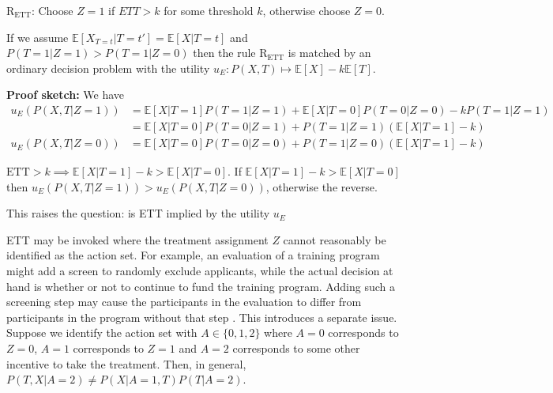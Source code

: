 \textbf{$\text{R}_{\text{ETT}}$}: Choose $Z=1$ if $ETT>k$ for some threshold $k$, otherwise choose $Z=0$.

If we assume $\mathbb{E}[X_{T=t}|T=t']=\mathbb{E}[X|T=t]$ and $P(T=1|Z=1)>P(T=1|Z=0)$ then the rule \textbf{$\text{R}_{\text{ETT}}$} is matched by an ordinary decision problem with the utility $u_E:P(X,T)\mapsto \mathbb{E}[X]-k\mathbb{E}[T]$.

\textbf{Proof sketch:} We have
\begin{align}
    u_E(P(X,T|Z=1)) &= \mathbb{E}[X|T=1]P(T=1|Z=1) + \mathbb{E}[X|T=0]P(T=0|Z=0) - kP(T=1|Z=1)\\
    &= \mathbb{E}[X|T=0]P(T=0|Z=1) + P(T=1|Z=1)(\mathbb{E}[X|T=1] - k)\\
    u_E(P(X,T|Z=0)) &= \mathbb{E}[X|T=0]P(T=0|Z=0) + P(T=1|Z=0)(\mathbb{E}[X|T=1]-k)
\end{align}

$\text{ETT}>k\implies \mathbb{E}[X|T=1]-k>\mathbb{E}[X|T=0]$. If $\mathbb{E}[X|T=1]-k>\mathbb{E}[X|T=0]$ then $u_E(P(X,T|Z=1))>u_E(P(X,T|Z=0))$, otherwise the reverse.

This raises the question: is ETT implied by the utility $u_E$ 


ETT may be invoked where the treatment assignment $Z$ cannot reasonably be identified as the action set. For example, an evaluation of a training program might add a screen to randomly exclude applicants, while the actual decision at hand is whether or not to continue to fund the training program. Adding such a screening step may cause the participants in the evaluation to differ from participants in the program without that step \cite{heckman_randomization_1991}. This introduces a separate issue. Suppose we identify the action set with $A\in \{0,1,2\}$ where $A=0$ corresponds to $Z=0$, $A=1$ corresponds to $Z=1$ and $A=2$ corresponds to some other incentive to take the treatment. Then, in general, $P(T,X|A=2)\neq P(X|A=1,T)P(T|A=2)$.



